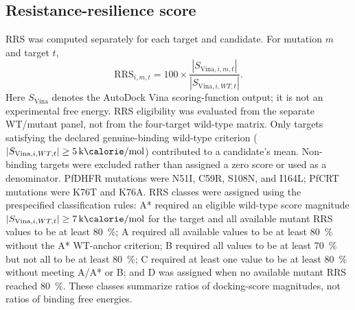 \documentclass[11pt,a4paper]{article}
\begin{document}
	\subsection{Resistance-resilience score}\label{sec:methods_rrs}
	RRS was computed separately for each target and candidate. For mutation $m$ and target $t$,
	\begin{equation}
		\mathrm{RRS}_{i,m,t}=100\times\frac{|S_{\mathrm{Vina},i,m,t}|}{|S_{\mathrm{Vina},i,WT,t}|}.
		\label{eq:rrs}
	\end{equation}
	Here $S_{\mathrm{Vina}}$ denotes the AutoDock Vina scoring-function output; it is not an experimental free energy. RRS eligibility was evaluated from the separate WT/mutant panel, not from the four-target wild-type matrix. Only targets satisfying the declared genuine-binding wild-type criterion ($|S_{\mathrm{Vina},i,WT,t}|\geq\qty{5}{\kilo\calorie\per\mol}$) contributed to a candidate's mean. Non-binding targets were excluded rather than assigned a zero score or used as a denominator. PfDHFR mutations were N51I, C59R, S108N, and I164L; PfCRT mutations were K76T and K76A. RRS classes were assigned using the prespecified classification rules: A* required an eligible wild-type score magnitude $|S_{\mathrm{Vina},i,WT,t}|\geq\qty{7}{\kilo\calorie\per\mol}$ for the target and all available mutant RRS values to be at least \qty{80}{\percent}; A required all available values to be at least \qty{80}{\percent} without the A* WT-anchor criterion; B required all values to be at least \qty{70}{\percent} but not all to be at least \qty{80}{\percent}; C required at least one value to be at least \qty{80}{\percent} without meeting A/A* or B; and D was assigned when no available mutant RRS reached \qty{80}{\percent}. These classes summarize ratios of docking-score magnitudes, not ratios of binding free energies.
	
\end{document}

